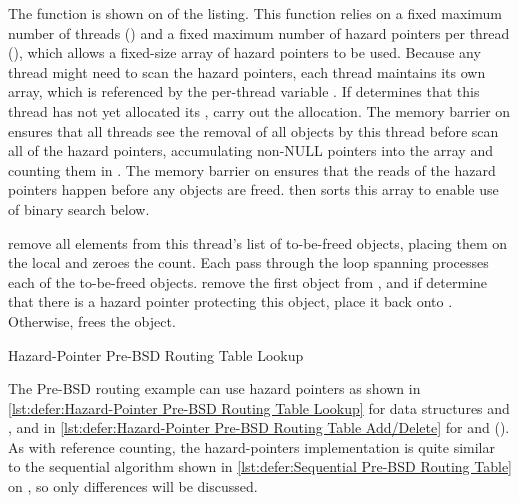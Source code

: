 \begin{fcvref}
The  function is shown on 
of the listing.
This function relies on a fixed maximum number of threads ()
and a fixed maximum number of hazard pointers per thread (),
which allows a fixed-size array of hazard pointers to be used.
Because any thread might need to scan the hazard pointers, each thread
maintains its own array, which is referenced by the per-thread variable
.
If  determines that this thread has not yet allocated its
,  carry out the allocation.
The memory barrier on  ensures that all threads see the
removal of all objects by this thread before
 scan
all of the hazard pointers, accumulating non-NULL pointers into
the  array and counting them in .
The memory barrier on  ensures that the reads of
the hazard pointers
happen before any objects are freed.
 then sorts this array to enable use of binary search below.

remove all elements from this thread's list of
to-be-freed objects, placing them on the local 
and  zeroes the count.
Each pass through the loop spanning
 processes each
of the to-be-freed objects.
remove the first object from ,
and if 
determine that there is a hazard pointer
protecting this object, 
place it back onto .
Otherwise,  frees the object.
\end{fcvref}

\begin{listing}

\caption{Hazard-Pointer Pre-BSD Routing Table Lookup}
\label{lst:defer:Hazard-Pointer Pre-BSD Routing Table Lookup}
\end{listing}

The Pre-BSD routing example can use hazard pointers as shown in
\cref{lst:defer:Hazard-Pointer Pre-BSD Routing Table Lookup}
for data structures and , and in
\cref{lst:defer:Hazard-Pointer Pre-BSD Routing Table Add/Delete}
for  and 
().
As with reference counting, the hazard-pointers implementation
is quite similar to the sequential algorithm shown in
\cref{lst:defer:Sequential Pre-BSD Routing Table}
on
,
so only differences will be discussed.

